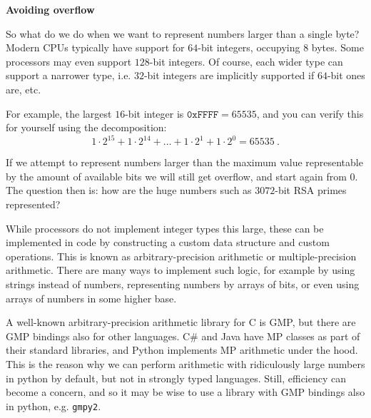 \documentclass[parskip=half]{scrartcl}
\begin{document}
\textbf{Avoiding overflow}

So what do we do when we want to represent numbers larger than a single byte?
Modern CPUs typically have support for $64$-bit integers, occupying $8$ bytes.
Some processors may even support $128$-bit integers.
Of course, each wider type can support a narrower type, i.e. $32$-bit integers are implicitly supported if $64$-bit ones are, etc.

For example, the largest $16$-bit integer is $\texttt{0xFFFF} = 65535$, and you can verify this for yourself using the decomposition:
\[
  1\cdot2^{15} + 1\cdot2^{14} + \dots + 1\cdot2^1 + 1\cdot2^0 = 65535\ .
\]

If we attempt to represent numbers larger than the maximum value representable by the amount of available bits we will still get overflow, and start again from $0$.
The question then is: how are the huge numbers such as $3072$-bit RSA primes represented?

While processors do not implement integer types this large, these can be implemented in code by constructing a custom data structure and custom operations.
This is known as arbitrary-precision arithmetic or multiple-precision arithmetic.
There are many ways to implement such logic, for example by using strings instead of numbers, representing numbers by arrays of bits, or even using arrays of numbers in some higher base.

A well-known arbitrary-precision arithmetic library for C is GMP\footnotemark{}, but there are GMP bindings also for other languages.
C\# and Java have MP classes as part of their standard libraries, and Python implements MP arithmetic under the hood.
This is the reason why we can perform arithmetic with ridiculously large numbers in python by default, but not in strongly typed languages.
Still, efficiency can become a concern, and so it may be wise to use a library with GMP bindings also in python, e.g. \texttt{gmpy2}\footnotemark{}.
\end{document}
